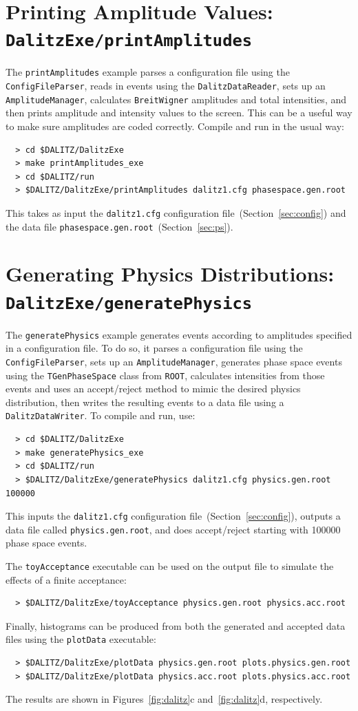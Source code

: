 \documentclass[11pt]{article}
\begin{document}
\section{Printing Amplitude Values: \\
{\tt DalitzExe/printAmplitudes}}

The {\tt printAmplitudes} example parses a configuration file using the {\tt ConfigFileParser}, reads in events using the {\tt DalitzDataReader}, sets up an {\tt AmplitudeManager}, calculates {\tt BreitWigner} amplitudes and total intensities, and then prints amplitude and intensity values to the screen. This can be a useful way to make sure amplitudes are coded correctly.  Compile and run in the usual way:
\begin{verbatim}
  > cd $DALITZ/DalitzExe
  > make printAmplitudes_exe
  > cd $DALITZ/run
  > $DALITZ/DalitzExe/printAmplitudes dalitz1.cfg phasespace.gen.root
\end{verbatim}
This takes as input the {\tt dalitz1.cfg} configuration file~(Section~\ref{sec:config}) and the data file {\tt phasespace.gen.root}~(Section~\ref{sec:ps}).

\section{Generating Physics Distributions: \\ 
{\tt DalitzExe/generatePhysics}}
\label{sec:physics}

The {\tt generatePhysics} example generates events according to amplitudes specified in a configuration file.  To do so, it parses a configuration file using the {\tt ConfigFileParser}, sets up an {\tt AmplitudeManager}, generates phase space events using the {\tt TGenPhaseSpace} class from {\tt ROOT}, calculates intensities from those events and uses an accept/reject method to mimic the desired physics distribution, then writes the resulting events to a data file using a {\tt DalitzDataWriter}.  To compile and run, use:
\begin{verbatim}
  > cd $DALITZ/DalitzExe
  > make generatePhysics_exe
  > cd $DALITZ/run
  > $DALITZ/DalitzExe/generatePhysics dalitz1.cfg physics.gen.root 100000
\end{verbatim}
This inputs the {\tt dalitz1.cfg} configuration file~(Section~\ref{sec:config}), outputs a data file called {\tt physics.gen.root}, and does accept/reject starting with 100000 phase space events.

The {\tt toyAcceptance} executable can be used on the output file to simulate the effects of a finite acceptance:
\begin{verbatim}
  > $DALITZ/DalitzExe/toyAcceptance physics.gen.root physics.acc.root
\end{verbatim}
Finally, histograms can be produced from both the generated and accepted data files using the {\tt plotData} executable:
\begin{verbatim}
  > $DALITZ/DalitzExe/plotData physics.gen.root plots.physics.gen.root
  > $DALITZ/DalitzExe/plotData physics.acc.root plots.physics.acc.root
\end{verbatim}
The results are shown in Figures~\ref{fig:dalitz}c and~\ref{fig:dalitz}d, respectively.
\end{document}
